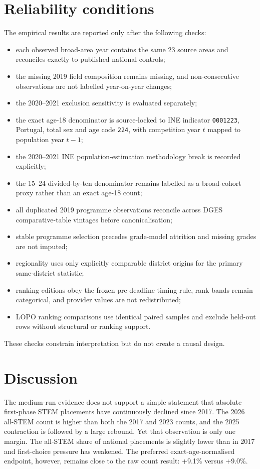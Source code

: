 \documentclass[11pt,a4paper]{article}
\begin{document}
\section{Reliability conditions}
The empirical results are reported only after the following checks:
\begin{itemize}
\setlength{\itemsep}{0pt}
\setlength{\parskip}{0pt}
\item each observed broad-area year contains the same 23 source areas and reconciles exactly to published national controls;
\item the missing 2019 field composition remains missing, and non-consecutive observations are not labelled year-on-year changes;
\item the 2020--2021 exclusion sensitivity is evaluated separately;
\item the exact age-18 denominator is source-locked to INE indicator \texttt{0001223}, Portugal, total sex and age code \texttt{224}, with competition year $t$ mapped to population year $t-1$;
\item the 2020--2021 INE population-estimation methodology break is recorded explicitly;
\item the 15--24 divided-by-ten denominator remains labelled as a broad-cohort proxy rather than an exact age-18 count;
\item all duplicated 2019 programme observations reconcile across DGES comparative-table vintages before canonicalisation;
\item stable programme selection precedes grade-model attrition and missing grades are not imputed;
\item regionality uses only explicitly comparable district origins for the primary same-district statistic;
\item ranking editions obey the frozen pre-deadline timing rule, rank bands remain categorical, and provider values are not redistributed;
\item LOPO ranking comparisons use identical paired samples and exclude held-out rows without structural or ranking support.
\end{itemize}
These checks constrain interpretation but do not create a causal design.

\section{Discussion}
The medium-run evidence does not support a simple statement that absolute first-phase STEM placements have continuously declined since 2017. The 2026 all-STEM count is higher than both the 2017 and 2023 counts, and the 2025 contraction is followed by a large rebound. Yet that observation is only one margin. The all-STEM share of national placements is slightly lower than in 2017 and first-choice pressure has weakened. The preferred exact-age-normalised endpoint, however, remains close to the raw count result: +9.1\% versus +9.0\%.
\end{document}
